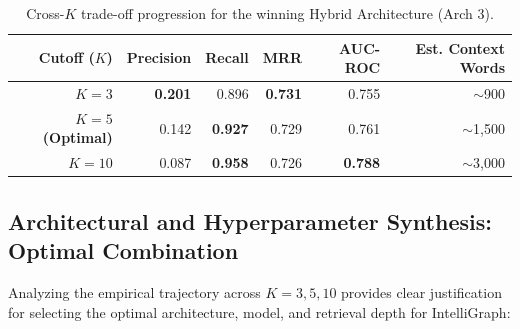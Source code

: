 \documentclass[11pt,a4paper]{article}
\begin{document}
\begin{table}[H]
\centering
\caption{Cross-$K$ trade-off progression for the winning Hybrid Architecture (Arch 3).}
\begin{tabular}{rrrrrr}
\toprule
\textbf{Cutoff ($K$)} & \textbf{Precision} & \textbf{Recall} & \textbf{MRR} & \textbf{AUC-ROC} & \textbf{Est. Context Words} \\
\midrule
$K=3$  & \textbf{0.201} & 0.896 & \textbf{0.731} & 0.755 & $\sim$900 \\
\textbf{$K=5$ (Optimal)} & 0.142 & \textbf{0.927} & 0.729 & 0.761 & $\sim$1,500 \\
$K=10$ & 0.087 & \textbf{0.958} & 0.726 & \textbf{0.788} & $\sim$3,000 \\
\bottomrule
\end{tabular}
\end{table}

\subsection{Architectural and Hyperparameter Synthesis: Optimal Combination}
Analyzing the empirical trajectory across $K = 3, 5, 10$ provides clear justification for selecting the optimal architecture, model, and retrieval depth for IntelliGraph:
\end{document}
